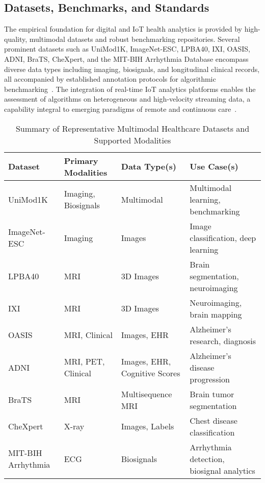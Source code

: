 \documentclass[11pt]{article}
\begin{document}
\subsection{Datasets, Benchmarks, and Standards}

The empirical foundation for digital and IoT health analytics is provided by high-quality, multimodal datasets and robust benchmarking repositories. Several prominent datasets \— such as UniMod1K, ImageNet-ESC, LPBA40, IXI, OASIS, ADNI, BraTS, CheXpert, and the MIT-BIH Arrhythmia Database \— encompass diverse data types including imaging, biosignals, and longitudinal clinical records, all accompanied by established annotation protocols for algorithmic benchmarking~\cite{ref35, ref43, ref48, ref49, ref50, ref51, ref58, ref66, ref67, ref74, ref75, ref88, ref89, ref90, ref101, ref106}. The integration of real-time IoT analytics platforms enables the assessment of algorithms on heterogeneous and high-velocity streaming data, a capability integral to emerging paradigms of remote and continuous care~\cite{ref67, ref106}.

\begin{table}[h]
\centering
\caption{Summary of Representative Multimodal Healthcare Datasets and Supported Modalities}
\label{tab:dataset_overview}
\begin{tabular}{|l|p{4cm}|p{3cm}|p{4cm}|}
\hline
\textbf{Dataset} & \textbf{Primary Modalities} & \textbf{Data Type(s)} & \textbf{Use Case(s)} \\
\hline
UniMod1K & Imaging, Biosignals & Multimodal & Multimodal learning, benchmarking \\
ImageNet-ESC & Imaging & Images & Image classification, deep learning \\
LPBA40 & MRI & 3D Images & Brain segmentation, neuroimaging \\
IXI & MRI & 3D Images & Neuroimaging, brain mapping \\
OASIS & MRI, Clinical & Images, EHR & Alzheimer’s research, diagnosis \\
ADNI & MRI, PET, Clinical & Images, EHR, Cognitive Scores & Alzheimer’s disease progression \\
BraTS & MRI & Multisequence MRI & Brain tumor segmentation \\
CheXpert & X-ray & Images, Labels & Chest disease classification \\
MIT-BIH Arrhythmia & ECG & Biosignals & Arrhythmia detection, biosignal analytics \\
\hline
\end{tabular}
\end{table}
\end{document}
